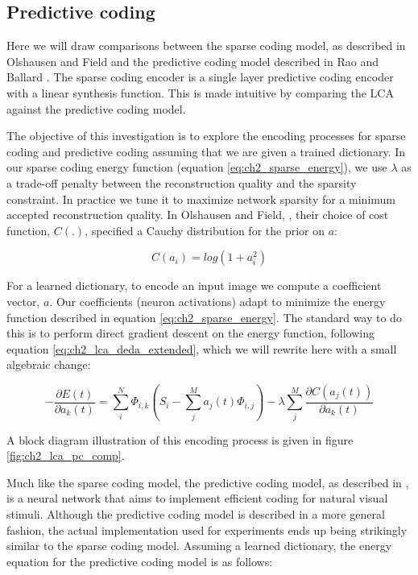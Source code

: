\subsection{Predictive coding}
Here we will draw comparisons between the sparse coding model, as described in Olshausen and Field \citeyearpar{olshausen1997sparse} and the predictive coding model described in Rao and Ballard \citeyearpar{rao1999predictive}. The sparse coding encoder is a single layer predictive coding encoder with a linear synthesis function. This is made intuitive by comparing the LCA against the predictive coding model.

The objective of this investigation is to explore the encoding processes for sparse coding and predictive coding assuming that we are given a trained dictionary. In our sparse coding energy function (equation \eqref{eq:ch2_sparse_energy}), we use $\lambda$ as a trade-off penalty between the reconstruction quality and the sparsity constraint. In practice we tune it to maximize network sparsity for a minimum accepted reconstruction quality. In Olshausen and Field, \citeyearpar{olshausen1997sparse}, their choice of cost function, $C(.)$, specified a Cauchy distribution for the prior on $a$:

\begin{equation}\label{eq:ch2_cauchy_cost}
  C(a_{i}) = log(1+a_{i}^{2})
\end{equation}

For a learned dictionary, to encode an input image we compute a coefficient vector, $a$. Our coefficients (neuron activations) adapt to minimize the energy function described in equation \eqref{eq:ch2_sparse_energy}. The standard way to do this is to perform direct gradient descent on the energy function, following equation \eqref{eq:ch2_lca_deda_extended}, which we will rewrite here with a small algebraic change:

\begin{equation}\label{eq:ch2_sc_deda_rewrite}
    - \frac{\partial E(t)}{\partial a_{k}(t)}
    =
        \sum\limits_{i}^{N} \Phi_{i,k} \left(S_{i} - \sum\limits_{j}^{M}a_{j}(t) \Phi_{i,j}\right) -
        \lambda \sum\limits_{j}^{M}\frac{\partial C(a_{j}(t))}{\partial a_{k}(t)}
\end{equation}

A block diagram illustration of this encoding process is given in figure \ref{fig:ch2_lca_pc_comp}.

Much like the sparse coding model, the predictive coding model, as described in \parencite{rao1997dynamic, rao1999predictive}, is a neural network that aims to implement efficient coding for natural visual stimuli. Although the predictive coding model is described in a more general fashion, the actual implementation used for experiments ends up being strikingly similar to the sparse coding model. Assuming a learned dictionary, the energy equation for the predictive coding model is as follows:

